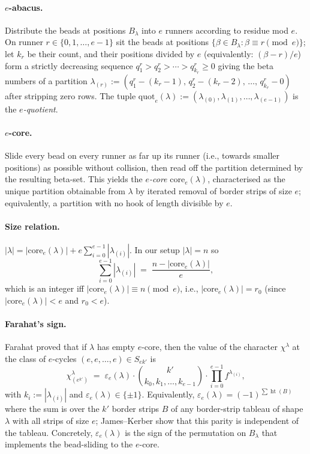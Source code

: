 \documentclass[11pt]{article}
\theoremstyle{definition}
\theoremstyle{remark}
\DeclareMathOperator{\hgt}{ht}
\newcommand{\core}{\mathrm{core}}
\newcommand{\quot}{\mathrm{quot}}
\begin{document}
\paragraph{$e$-abacus.}
Distribute the beads at positions $B_\lambda$ into $e$ runners according to
residue mod $e$. On runner $r\in\{0,1,\ldots,e-1\}$ sit the beads at positions
$\{\beta\in B_\lambda : \beta\equiv r\pmod e\}$; let $k_r$ be their count, and
their positions divided by $e$ (equivalently: $(\beta-r)/e$) form a strictly
decreasing sequence $q_1^r>q_2^r>\cdots>q_{k_r}^r\ge 0$ giving the beta
numbers of a partition
$\lambda_{(r)}:=(q_1^r-(k_r-1),\,q_2^r-(k_r-2),\,\ldots,\,q_{k_r}^r-0)$
after stripping zero rows. The tuple
$\quot_e(\lambda):=(\lambda_{(0)},\lambda_{(1)},\ldots,\lambda_{(e-1)})$
is the \emph{$e$-quotient}.

\paragraph{$e$-core.}
Slide every bead on every runner as far up its runner (i.e., towards smaller
positions) as possible without collision, then read off the partition
determined by the resulting beta-set. This yields the \emph{$e$-core}
$\core_e(\lambda)$, characterised as the unique partition obtainable from
$\lambda$ by iterated removal of border strips of size $e$; equivalently, a
partition with no hook of length divisible by $e$.

\paragraph{Size relation.}
$|\lambda|=|\core_e(\lambda)|+e\sum_{i=0}^{e-1}|\lambda_{(i)}|$. In our setup
$|\lambda|=n$ so
\begin{equation}
  \sum_{i=0}^{e-1}|\lambda_{(i)}| \;=\; \frac{n-|\core_e(\lambda)|}{e},
\end{equation}
which is an integer iff $|\core_e(\lambda)|\equiv n\pmod e$, i.e.,
$|\core_e(\lambda)|=r_0$ (since $|\core_e(\lambda)|<e$ and $r_0<e$).

\paragraph{Farahat's sign.}
Farahat \cite{Far54} proved that if $\lambda$ has empty $e$-core, then the
value of the character $\chi^\lambda$ at the class of $e$-cycles
$(e,e,\ldots,e)\in S_{ek'}$ is
\begin{equation}
\label{eq:farahat-classical}
  \chi^\lambda_{(e^{k'})} \;=\;
  \varepsilon_e(\lambda)\cdot\binom{k'}{k_0,k_1,\ldots,k_{e-1}}
  \cdot\prod_{i=0}^{e-1}f^{\lambda_{(i)}},
\end{equation}
with $k_i:=|\lambda_{(i)}|$ and $\varepsilon_e(\lambda)\in\{\pm 1\}$.
Equivalently, $\varepsilon_e(\lambda)=(-1)^{\sum \hgt(B)}$ where the sum is
over the $k'$ border strips $B$ of any border-strip tableau of shape
$\lambda$ with all strips of size $e$; James--Kerber \cite[Thm.~2.7.32]{JK81}
show that this parity is independent of the tableau. Concretely,
$\varepsilon_e(\lambda)$ is the sign of the permutation on $B_\lambda$ that
implements the bead-sliding to the $e$-core.
\end{document}
